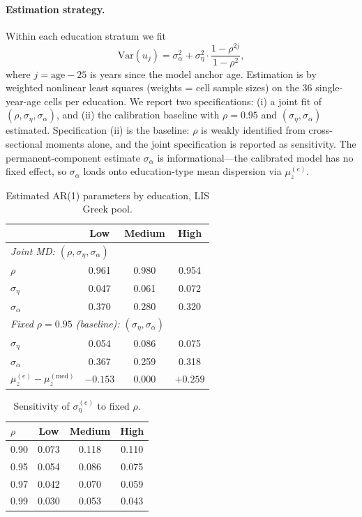 \paragraph{Estimation strategy.} Within each education stratum we fit
\begin{equation}\label{eq:lis-md}
\mathrm{Var}(u_j) = \sigma_\alpha^2 + \sigma_\eta^2 \cdot \frac{1 - \rho^{2j}}{1 - \rho^2},
\end{equation}
where $j = \text{age} - 25$ is years since the model anchor age. Estimation is by weighted nonlinear least squares (weights = cell sample sizes) on the 36 single-year-age cells per education. We report two specifications: (i) a joint fit of $(\rho, \sigma_\eta, \sigma_\alpha)$, and (ii) the calibration baseline with $\rho = 0.95$ and $(\sigma_\eta, \sigma_\alpha)$ estimated. Specification (ii) is the baseline: $\rho$ is weakly identified from cross-sectional moments alone, and the joint specification is reported as sensitivity. The permanent-component estimate $\sigma_\alpha$ is informational---the calibrated model has no fixed effect, so $\sigma_\alpha$ loads onto education-type mean dispersion via $\mu_z^{(e)}$.

\begin{table}[H]
\centering
\small
\caption{Estimated AR(1) parameters by education, LIS Greek pool.}
\label{tab:lis-estimates}
\begin{tabular}{lccc}
\toprule
 & Low & Medium & High \\
\midrule
\multicolumn{4}{l}{\textit{Joint MD: $(\rho, \sigma_\eta, \sigma_\alpha)$}} \\
\quad $\rho$ & 0.961 & 0.980 & 0.954 \\
\quad $\sigma_\eta$ & 0.047 & 0.061 & 0.072 \\
\quad $\sigma_\alpha$ & 0.370 & 0.280 & 0.320 \\
\midrule
\multicolumn{4}{l}{\textit{Fixed $\rho = 0.95$ (baseline): $(\sigma_\eta, \sigma_\alpha)$}} \\
\quad $\sigma_\eta$ & 0.054 & 0.086 & 0.075 \\
\quad $\sigma_\alpha$ & 0.367 & 0.259 & 0.318 \\
\midrule
$\mu_z^{(e)} - \mu_z^{(\text{med})}$ & $-0.153$ & $0.000$ & $+0.259$ \\
\bottomrule
\end{tabular}
\end{table}

\begin{table}[H]
\centering
\small
\caption{Sensitivity of $\sigma_\eta^{(e)}$ to fixed $\rho$.}
\label{tab:lis-rho-sensitivity}
\begin{tabular}{lccc}
\toprule
$\rho$ & Low & Medium & High \\
\midrule
0.90 & 0.073 & 0.118 & 0.110 \\
0.95 & 0.054 & 0.086 & 0.075 \\
0.97 & 0.042 & 0.070 & 0.059 \\
0.99 & 0.030 & 0.053 & 0.043 \\
\bottomrule
\end{tabular}
\end{table}

